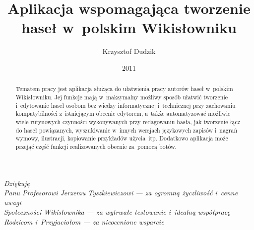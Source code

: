 \documentclass{pracamgr}
\author{Krzysztof Dudzik}
\title{Aplikacja wspomagająca tworzenie haseł w~polskim Wikisłowniku}
\date{2011}
\newenvironment{dedication}
{
   \cleardoublepage
   \thispagestyle{empty}
   \vspace*{\stretch{8}}
   \hfill\begin{minipage}[t]{0.85\textwidth}
   \raggedright
}%
{
   \end{minipage}
   \vspace*{\stretch{2}}
   \clearpage
}
\begin{document}
\maketitle

\begin{abstract}
  Tematem pracy jest aplikacja służąca do ułatwienia pracy autorów haseł w~polskim Wikisłowniku. Jej funkcje mają w~maksymalny możliwy sposób ułatwić tworzenie i~edytowanie haseł osobom bez wiedzy informatycznej i~technicznej przy zachowaniu kompatybilności z~istniejącym obecnie edytorem, a~także automatyzować możliwie wiele rutynowych czynności wykonywanych przy redagowaniu hasła, jak tworzenie łącz do haseł powiązanych, wyszukiwanie w~innych wersjach językowych zapisów i~nagrań wymowy, ilustracji, kopiowanie przykładów użycia~itp. Dodatkowo aplikacja może przejąć część funkcji realizowanych obecnie za~pomocą botów.
\end{abstract}

\begin{dedication}
\emph{Dziękuję} \\
\emph{Panu Profesorowi Jerzemu Tyszkiewiczowi --- za ogromną życzliwość i~cenne uwagi} \\
\emph{Społeczności Wikisłownika --- za wytrwałe testowanie i~idealną współpracę} \\
\emph{Rodzicom i~Przyjaciołom --- za nieocenione wsparcie}

\end{dedication}
\tableofcontents
\end{document}
